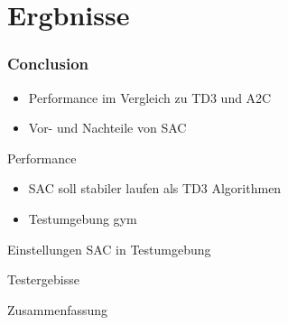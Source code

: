 \section*{Ergbnisse}
\begin{frame}
    \frametitle{Conclusion}
    \begin{itemize}    
        \item Performance im Vergleich zu TD3 und A2C
        \item Vor- und Nachteile von SAC
    \end{itemize}
\end{frame}

\begin{frame}{Performance}
    \begin{itemize}
        \item SAC soll stabiler laufen als TD3 Algorithmen
        \item Testumgebung gym
    \end{itemize}    
\end{frame}


\begin{frame}{Einstellungen SAC in Testumgebung}
        
\end{frame}

\begin{frame}{Testergebisse}
        
\end{frame}


\begin{frame}{Zusammenfassung}
        
\end{frame}

